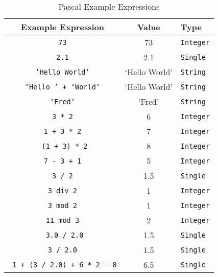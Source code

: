 \begin{table}[h]
  \begin{minipage}{\textwidth}
  \centering
  \begin{tabular}{|c|c|l|}
    \hline
    \textbf{Example Expression} & \textbf{Value} & \textbf{Type} \\
    \hline
    \texttt{ 73 }     &   73                 & \texttt{Integer}  \\
    \texttt{ 2.1 }      & 2.1   & \texttt{Single}    \\
    \texttt{ `Hello World' }      &   `Hello World'    & \texttt{String}   \\
    \texttt{ `Hello ' + `World' }      &   `Hello World'    & \texttt{String}   \\
    \texttt{ `Fred' }      &   `Fred'    & \texttt{String}   \\
    \texttt{ 3 * 2 } & 6 & \texttt{Integer} \\
    \texttt{ 1 + 3 * 2 }  & 7 & \texttt{Integer} \\
    \texttt{ (1 + 3) * 2} & 8 & \texttt{Integer} \\
    \texttt{ 7 - 3 + 1 }  & 5 & \texttt{Integer} \\
    \texttt{ 3 / 2 } & 1.5 & \texttt{Single} \\
    \texttt{ 3 div 2 } & 1 & \texttt{Integer} \\
    \texttt{ 3 mod 2 } & 1 & \texttt{Integer} \\
    \texttt{ 11 mod 3 } & 2 & \texttt{Integer} \\
    \texttt{ 3.0 / 2.0} & 1.5 & \texttt{Single} \\
    \texttt{ 3 / 2.0 } & 1.5 & \texttt{Single} \\
    \texttt{ 1 + (3 / 2.0) + 6 * 2 - 8} & 6.5 & \texttt{Single} \\
    \hline
  \end{tabular}
\end{minipage}
  \caption{Pascal Example Expressions}
  \label{tbl:program-creation-pas example expresions}
\end{table}




